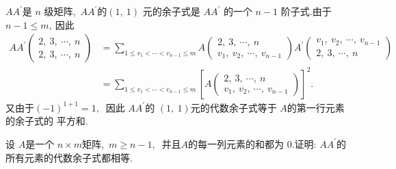 \begin{solution}
	$ A A^{\prime}  $是 $ n$  级矩阵,\ $  A A^{\prime}  $的$  (1,\ 1) $ 元的余子式是 $ A A^{\prime}$ 的一个 $ n-1 $ 阶子式.由于 $ n-1 \leqslant m ,\ $因此
	$$\begin{aligned}
		A A^{\prime}\left(\begin{array}{l}
			2,\ 3,\  \cdots,\  n \\
			2,\ 3,\  \cdots,\  n
		\end{array}\right) & =\sum_{1 \leqslant v_{1}<\cdots<v_{n-1} \leqslant m} A\left(\begin{array}{l}
			2,\ 3,\  \cdots,\  n \\
			v_{1},\  v_{2},\  \cdots,\  v_{n-1}
		\end{array}\right) A^{\prime}\left(\begin{array}{l}
			v_{1},\  v_{2},\  \cdots,\  v_{n-1} \\
			2,\ 3,\  \cdots,\  n
		\end{array}\right) \\
		& =\sum_{1 \leqslant v_{1}<\cdots<v_{n-1} \leqslant m}\left[A\left(\begin{array}{l}
			2,\ 3,\  \cdots,\  n \\
			v_{1},\  v_{2},\  \cdots,\  v_{n-1}
		\end{array}\right)\right]^{2} .
	\end{aligned}$$
	又由于$  (-1)^{1+1}=1 ,\ $ 因此 $ A A^{\prime} $的 $ (1,\ 1)  $元的代数余子式等于 $ A  $的第一行元素的余子式的 平方和.
\end{solution}
\newpage
\begin{problem}
	设 $ A  $是一个 $ n \times m  $矩阵,\   $m \geqslant n-1 ,\ $ 并且$  A  $的每一列元素的和都为 $0 .$证明: $ A A^{\prime}  $的所有元素的代数余子式都相等.
\end{problem}
